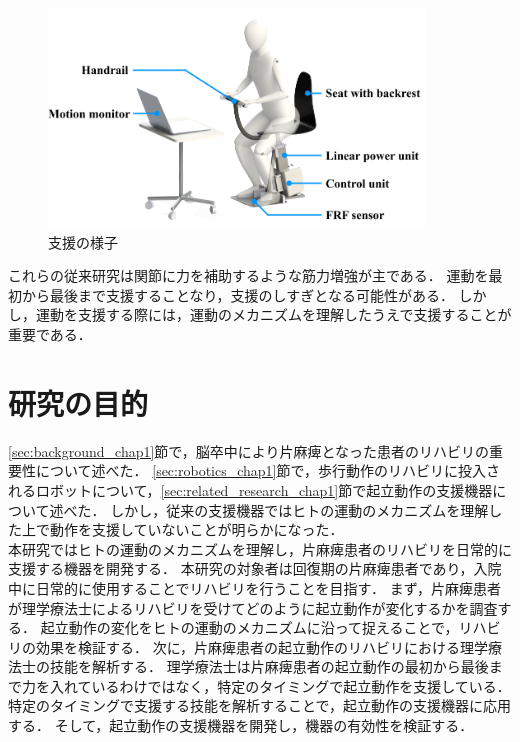 \begin{figure}[b]
	\begin{center}
		\includegraphics[width=10cm]{./Chap1/fig/Handrail.PNG}
		\caption{支援の様子\cite{Shiraishi2016}}
		\label{fig:Handrail}
	\end{center}
\end{figure}


これらの従来研究は関節に力を補助するような筋力増強が主である．
運動を最初から最後まで支援することなり，支援のしすぎとなる可能性がある．
しかし，運動を支援する際には，運動のメカニズムを理解したうえで支援することが重要である．



\clearpage
\section{研究の目的}
\label{sec:objective_chap1}

\ref{sec:background_chap1}節で，脳卒中により片麻痺となった患者のリハビリの重要性について述べた．
\ref{sec:robotics_chap1}節で，歩行動作のリハビリに投入されるロボットについて，\ref{sec:related_research_chap1}節で起立動作の支援機器について述べた．
しかし，従来の支援機器ではヒトの運動のメカニズムを理解した上で動作を支援していないことが明らかになった．\\

本研究ではヒトの運動のメカニズムを理解し，片麻痺患者のリハビリを日常的に支援する機器を開発する．
本研究の対象者は回復期の片麻痺患者であり，入院中に日常的に使用することでリハビリを行うことを目指す．
まず，片麻痺患者が理学療法士によるリハビリを受けてどのように起立動作が変化するかを調査する．
起立動作の変化をヒトの運動のメカニズムに沿って捉えることで，リハビリの効果を検証する．
次に，片麻痺患者の起立動作のリハビリにおける理学療法士の技能を解析する．
理学療法士は片麻痺患者の起立動作の最初から最後まで力を入れているわけではなく，特定のタイミングで起立動作を支援している．
特定のタイミングで支援する技能を解析することで，起立動作の支援機器に応用する．
そして，起立動作の支援機器を開発し，機器の有効性を検証する．

